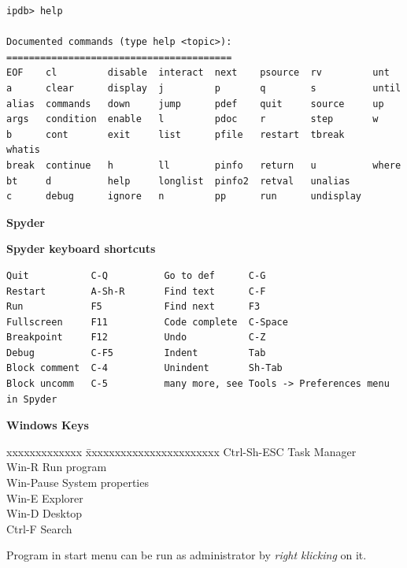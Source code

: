 \documentclass[9pt,a4wide]{extarticle}
\begin{document}
\begin{verbatim}
ipdb> help

Documented commands (type help <topic>):
========================================
EOF    cl         disable  interact  next    psource  rv         unt
a      clear      display  j         p       q        s          until
alias  commands   down     jump      pdef    quit     source     up
args   condition  enable   l         pdoc    r        step       w
b      cont       exit     list      pfile   restart  tbreak     whatis
break  continue   h        ll        pinfo   return   u          where
bt     d          help     longlist  pinfo2  retval   unalias
c      debug      ignore   n         pp      run      undisplay
\end{verbatim}


\medskip
{\bf Spyder}
{}

{\bf Spyder keyboard shortcuts}

\begin{verbatim}
Quit           C-Q          Go to def      C-G
Restart        A-Sh-R       Find text      C-F
Run            F5           Find next      F3
Fullscreen     F11          Code complete  C-Space
Breakpoint     F12          Undo           C-Z
Debug          C-F5         Indent         Tab
Block comment  C-4          Unindent       Sh-Tab
Block uncomm   C-5          many more, see Tools -> Preferences menu in Spyder
\end{verbatim}      


\medskip

{\bf Windows Keys}
{}

\begin{tabbing}
    xxxxxxxxxxxxx \= xxxxxxxxxxxxxxxxxxxxxxx \kill
    Ctrl-Sh-ESC   \> Task Manager \\
    Win-R         \> Run program \\
    Win-Pause     \> System properties \\
    Win-E         \> Explorer \\
    Win-D         \> Desktop  \\
    Ctrl-F        \> Search  \\
\end{tabbing}

Program in start menu can be run as administrator by {\em right klicking} on 
it.

\medskip
\end{document}
